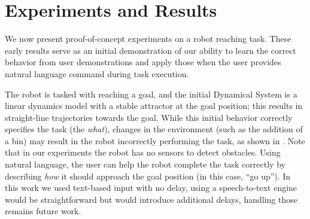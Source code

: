 \section{Experiments and Results}
\label{sec:results}

We now present proof-of-concept experiments on a robot reaching task.
These early results serve as an initial demonstration of our ability to learn the correct behavior from user demonstrations and apply those when the user provides natural language command during task execution.

The robot is tasked with reaching a goal, and the initial Dynamical System is a linear dynamics model with a stable attractor at the goal position; this results in straight-line trajectories towards the goal.
While this initial behavior correctly specifies the task (the \emph{what}), changes in the environment (such as the addition of a bin) may result in the robot incorrectly performing the task, as shown in . Note that in our experiments the robot has no sensors to detect obstacles.
Using natural language, the user can help the robot complete the task correctly by describing \emph{how} it should approach the goal position (in this case, ``go up'').
In this work we used text-based input with no delay, using a speech-to-text engine would be straightforward but would introduce additional delays, handling those remains future work.


